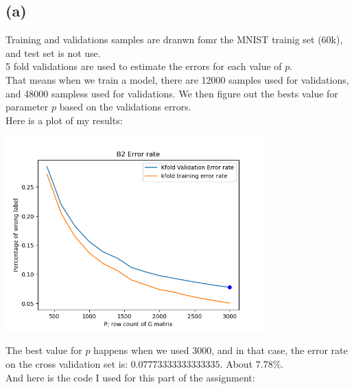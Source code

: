 \documentclass[]{article}
\begin{document}
		\subsection*{(a)}
			Training and validations samples are dranwn fomr the MNIST trainig set (60k), and test set is not use. 
			\\
			5 fold validations are used to estimate the errors for each value of $p$. 
			\\
			That means when we train a model, there are 12000 samples used for validations, and 48000 sampless used for validations. We then figure out the bests value for parameter $p$ based on the validations errors. 
			\\
			Here is a plot of my results: 
			\begin{center}
				\includegraphics[width=10cm]{B2plot.png}
			\end{center}
			The best value for $p$ happens when we used $3000$, and in that case, the error rate on the cross validation set is: $0.07773333333333335$. About $7.78\%$. 
			\\
			And here is the code I used for this part of the assignment: 
\end{document}
